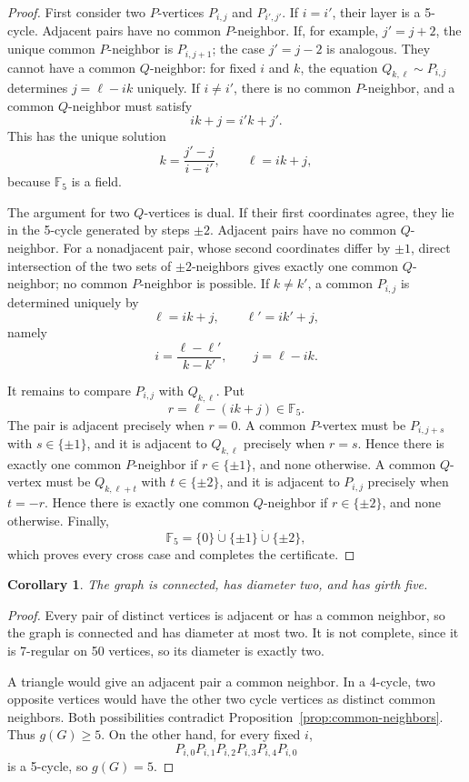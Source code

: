 \documentclass[a4paper,11pt,reqno]{amsart}
\theoremstyle{plain}
\newtheorem{corollary}[theorem]{Corollary}
\theoremstyle{definition}
\theoremstyle{remark}
\newcommand{\F}{\mathbb F_5}
\begin{document}
\begin{proof}
First consider two \(P\)-vertices \(P_{i,j}\) and \(P_{i',j'}\).  If
\(i=i'\), their layer is a 5-cycle.  Adjacent pairs have no common
\(P\)-neighbor.  If, for example, \(j'=j+2\), the unique common
\(P\)-neighbor is \(P_{i,j+1}\); the case \(j'=j-2\) is analogous.  They
cannot have a common \(Q\)-neighbor: for fixed \(i\) and \(k\), the equation
\(Q_{k,\ell}\sim P_{i,j}\) determines \(j=\ell-ik\) uniquely.  If
\(i\ne i'\), there is no common \(P\)-neighbor, and a common \(Q\)-neighbor
must satisfy
\[
 ik+j=i'k+j'.
\]
This has the unique solution
\[
 k=\frac{j'-j}{i-i'},\qquad \ell=ik+j,
\]
because \(\F\) is a field.

The argument for two \(Q\)-vertices is dual.  If their first coordinates
agree, they lie in the 5-cycle generated by steps \(\pm2\).  Adjacent pairs
have no common \(Q\)-neighbor.  For a nonadjacent pair, whose second
coordinates differ by \(\pm1\), direct intersection of the two sets of
\(\pm2\)-neighbors gives exactly one common \(Q\)-neighbor; no common
\(P\)-neighbor is possible.  If \(k\ne k'\), a common
\(P_{i,j}\) is determined uniquely by
\[
 \ell=ik+j,\qquad \ell'=ik'+j,
\]
namely
\[
 i=\frac{\ell-\ell'}{k-k'},\qquad j=\ell-ik.
\]

It remains to compare \(P_{i,j}\) with \(Q_{k,\ell}\).  Put
\[
 r=\ell-(ik+j)\in\F.
\]
The pair is adjacent precisely when \(r=0\).  A common \(P\)-vertex must be
\(P_{i,j+s}\) with \(s\in\{\pm1\}\), and it is adjacent to
\(Q_{k,\ell}\) precisely when \(r=s\).  Hence there is exactly one common
\(P\)-neighbor if \(r\in\{\pm1\}\), and none otherwise.  A common
\(Q\)-vertex must be \(Q_{k,\ell+t}\) with \(t\in\{\pm2\}\), and it is
adjacent to \(P_{i,j}\) precisely when \(t=-r\).  Hence there is exactly one
common \(Q\)-neighbor if \(r\in\{\pm2\}\), and none otherwise.  Finally,
\[
 \F=\{0\}\mathbin{\dot\cup}\{\pm1\}
          \mathbin{\dot\cup}\{\pm2\},
\]
which proves every cross case and completes the certificate.
\end{proof}

\begin{corollary}\label{cor:geometry}
The graph is connected, has diameter two, and has girth five.
\end{corollary}

\begin{proof}
Every pair of distinct vertices is adjacent or has a common neighbor, so the
graph is connected and has diameter at most two.  It is not complete, since
it is 7-regular on 50 vertices, so its diameter is exactly two.

A triangle would give an adjacent pair a common neighbor.  In a 4-cycle, two
opposite vertices would have the other two cycle vertices as distinct common
neighbors.  Both possibilities contradict
Proposition~\ref{prop:common-neighbors}.  Thus \(g(G)\ge5\).  On the other
hand, for every fixed \(i\),
\[
 P_{i,0}P_{i,1}P_{i,2}P_{i,3}P_{i,4}P_{i,0}
\]
is a 5-cycle, so \(g(G)=5\).
\end{proof}
\end{document}
